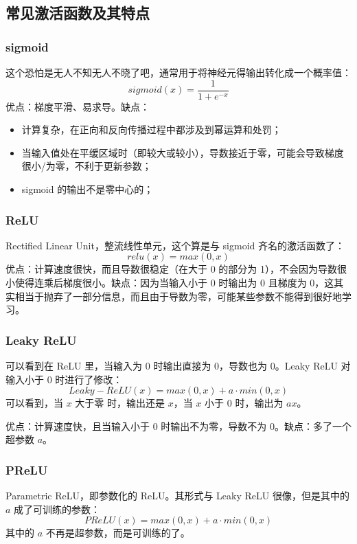 \subsection{常见激活函数及其特点}
\subsubsection{sigmoid}
这个恐怕是无人不知无人不晓了吧，通常用于将神经元得输出转化成一个概率值：
$$
sigmoid(x) = \frac{1}{1 + e^{-x}}
$$
优点：梯度平滑、易求导。缺点：
\begin{itemize}
	\item 计算复杂，在正向和反向传播过程中都涉及到幂运算和处罚；
	
	\item 当输入值处在平缓区域时（即较大或较小），导数接近于零，可能会导致梯度很小/为零，不利于更新参数；
	
	\item sigmoid 的输出不是零中心的；
\end{itemize}


\subsubsection{ReLU}
Rectified Linear Unit，整流线性单元，这个算是与 sigmoid 齐名的激活函数了：
$$
relu(x) = max(0, x)
$$
优点：计算速度很快，而且导数很稳定（在大于 0 的部分为 1），不会因为导数很小使得连乘后梯度很小。缺点：因为当输入小于 0 时输出为 0 且梯度为 0，这其实相当于抛弃了一部分信息，而且由于导数为零，可能某些参数不能得到很好地学习。


\subsubsection{Leaky ReLU}
可以看到在 ReLU 里，当输入为 0 时输出直接为 0，导数也为 0。Leaky ReLU 对输入小于 0 时进行了修改：
$$
Leaky-ReLU(x) = max(0, x) + a \cdot min(0, x)
$$
可以看到，当 $x$ 大于零 时，输出还是 $x$，当 $x$ 小于 0 时，输出为 $a x$。

优点：计算速度快，且当输入小于 0 时输出不为零，导数不为 0。缺点：多了一个超参数 $a$。

\subsubsection{PReLU}
Parametric ReLU，即参数化的 ReLU。其形式与 Leaky ReLU 很像，但是其中的 $a$ 成了可训练的参数：
$$
PReLU(x) = max(0, x) + a \cdot min(0, x)
$$
其中的 $a$ 不再是超参数，而是可训练的了。

